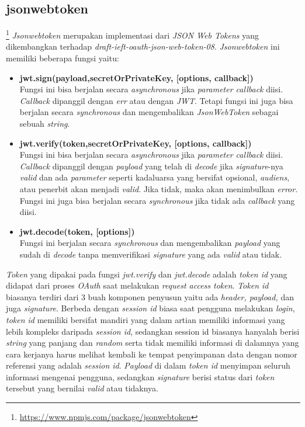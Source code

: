 \subsection{jsonwebtoken}\footnote{\url{https://www.npmjs.com/package/jsonwebtoken}}
\textit{Jsonwebtoken} merupakan implementasi dari \textit{JSON Web Tokens} yang dikembangkan terhadap \textit{draft-ieft-oauth-json-web-token-08}. \textit{Jsonwebtoken} ini memiliki beberapa fungsi yaitu:
\begin{itemize}
    \item \textbf{jwt.sign(payload,secretOrPrivateKey, [options, callback])}\\
    Fungsi ini bisa berjalan secara \textit{asynchronous} jika \textit{parameter callback} diisi. \textit{Callback} dipanggil dengan \textit{err} atau dengan \textit{JWT}. Tetapi fungsi ini juga bisa berjalan secara \textit{synchronous} dan mengembalikan \textit{JsonWebToken} sebagai sebuah \textit{string}. 
    \item \textbf{jwt.verify(token,secretOrPrivateKey, [options, callback])}\\
    Fungsi ini bisa berjalan secara \textit{asynchronous} jika \textit{parameter callback} diisi. \textit{Callback} dipanggil dengan \textit{payload} yang telah di \textit{decode} jika \textit{signature}-nya \textit{valid} dan ada \textit{parameter} seperti kadaluarsa yang bersifat opsional, \textit{audiens}, atau penerbit akan menjadi \textit{valid}. Jika tidak, maka akan menimbulkan \textit{error}. Fungsi ini juga bisa berjalan secara \textit{synchronous} jika tidak ada \textit{callback} yang diisi. 
    \item \textbf{jwt.decode(token, [options])}\\
    Fungsi ini berjalan secara \textit{synchronous} dan mengembalikan \textit{payload} yang sudah di \textit{decode} tanpa memverifikasi \textit{signature} yang ada \textit{valid} atau tidak. 
\end{itemize}

\textit{Token} yang dipakai pada fungsi \textit{jwt.verify} dan \textit{jwt.decode} adalah \textit{token id} yang didapat dari proses \textit{OAuth} saat melakukan \textit{request access token}. \textit{Token id} biasanya terdiri dari 3 buah komponen penyusun yaitu ada \textit{header, payload,} dan juga \textit{signature}. Berbeda dengan \textit{session id} biasa saat pengguna melakukan \textit{login}, \textit{token id} memiliki bersifat mandiri yang dalam artian memiliki informasi yang lebih kompleks daripada \textit{session id}, sedangkan session id biasanya hanyalah berisi \textit{string} yang panjang dan \textit{random} serta tidak memiliki informasi di dalamnya yang cara kerjanya harus melihat kembali ke tempat penyimpanan data dengan nomor referensi yang adalah \textit{session id}. \textit{Payload} di dalam \textit{token id} menyimpan seluruh informasi mengenai pengguna, sedangkan \textit{signature} berisi status dari \textit{token} tersebut yang bernilai \textit{valid} atau tidaknya. 

